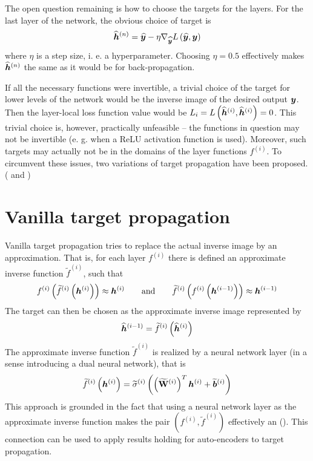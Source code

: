 The open question remaining is how to choose the targets for the layers. For the last layer of the network, the obvious choice of target is
\begin{equation}\label{targetprop_last_layer_target}
	\widehat{\bm{h}}^{(n)} = \widehat{\bm{y}} - \eta \nabla_{\widehat{\bm{y}}} L \left( \widehat{\bm{y}}, \bm{y} \right)
\end{equation}
where \( \eta \) is a step size, i. e. a hyperparameter. Choosing \( \eta = 0.5 \) effectively makes \( \widehat{\bm{h}}^{(n)} \) the same as it would be for back-propagation.

If all the necessary functions were invertible, a trivial choice of the target for lower levels of the network would be the inverse image of the desired output \( \bm{y} \). Then the layer-local loss function value would be \( L_i = L \left( \widehat{\bm{h}}^{(i)}, \widehat{\bm{h}}^{(i)} \right) = 0 \). This trivial choice is, however, practically unfeasible -- the functions in question may not be invertible (e. g. when a ReLU activation function is used). Moreover, such targets may actually not be in the domains of the layer functions \( f^{(i)} \). To circumvent these issues, two variations of target propagation have been proposed. (\cite{bengio_how_2014} and \cite{lee_difference_2015})

\section{Vanilla target propagation}\label{vanilla_targetprop}

Vanilla target propagation tries to replace the actual inverse image by an approximation. That is, for each layer \( f^{(i)} \) there is defined an approximate inverse function \( \widetilde{f}^{(i)} \), such that
\[ f^{(i)} \left( \widetilde{f}^{(i)} \left( \bm{h}^{(i)} \right) \right) \approx \bm{h}^{(i)} \qquad \text{and} \qquad \widetilde{f}^{(i)} \left( f^{(i)} \left( \bm{h}^{(i - 1)} \right) \right) \approx \bm{h}^{(i - 1)} \]
The target can then be chosen as the approximate inverse image represented by
\[ \widehat{\bm{h}}^{(i - 1)} = \widetilde{f}^{(i)} \left( \widehat{\bm{h}}^{(i)} \right) \]
The approximate inverse function \( \widetilde{f}^{(i)} \) is realized by a neural network layer (in a sense introducing a dual neural network), that is
\[ \widetilde{f}^{(i)} \left( \bm{h}^{(i)} \right) = \widetilde{\sigma}^{(i)} \left( \left( {\widetilde{\mathbf{W}}}^{(i)} \right)^T \bm{h}^{(i)} + \widetilde{\bm{b}}^{(i)} \right) \]
This approach is grounded in the fact that using a neural network layer as the approximate inverse function makes the pair \( \left( f^{(i)}, \widetilde{f}^{(i)} \right) \) effectively an  (\cite{bourlard_auto-association_1988}). This connection can be used to apply results holding for auto-encoders to target propagation.

